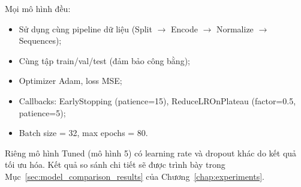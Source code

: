 Mọi mô hình đều:
\begin{itemize}
    \item Sử dụng cùng pipeline dữ liệu (Split $\to$ Encode $\to$ Normalize $\to$ Sequences);
    \item Cùng tập train/val/test (đảm bảo công bằng);
    \item Optimizer Adam, loss MSE;
    \item Callbacks: EarlyStopping (patience=15), ReduceLROnPlateau (factor=0.5, patience=5);
    \item Batch size = 32, max epochs = 80.
\end{itemize}

\noindent Riêng mô hình Tuned (mô hình 5) có learning rate và dropout khác do kết quả tối ưu hóa. Kết quả so sánh chi tiết sẽ được trình bày trong Mục~\ref{sec:model_comparison_results} của Chương~\ref{chap:experiments}.
